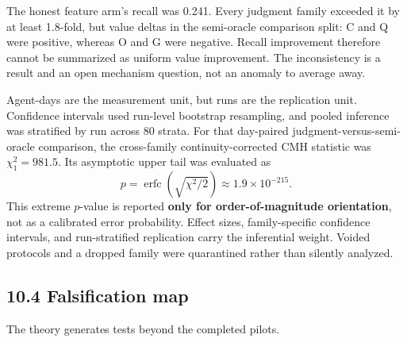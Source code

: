 \documentclass[
  11pt]{article}
\begin{document}
The honest feature arm's recall was 0.241. Every judgment family exceeded it by at least 1.8-fold, but value deltas in the semi-oracle comparison split: C and Q were positive, whereas O and G were negative. Recall improvement therefore cannot be summarized as uniform value improvement. The inconsistency is a result and an open mechanism question, not an anomaly to average away.

Agent-days are the measurement unit, but runs are the replication unit. Confidence intervals used run-level bootstrap resampling, and pooled inference was stratified by run across 80 strata. For that day-paired judgment-versus-semi-oracle comparison, the cross-family continuity-corrected CMH statistic was \(\chi^2_1=981.5\). Its asymptotic upper tail was evaluated as \[
p=\operatorname{erfc}\!\left(\sqrt{\chi^2/2}\right)
\approx1.9\times10^{-215}.
\] This extreme \(p\)-value is reported \textbf{only for order-of-magnitude orientation}, not as a calibrated error probability. Effect sizes, family-specific confidence intervals, and run-stratified replication carry the inferential weight. Voided protocols and a dropped family were quarantined rather than silently analyzed.

\subsection{10.4 Falsification map}\label{falsification-map}

The theory generates tests beyond the completed pilots.
\end{document}
